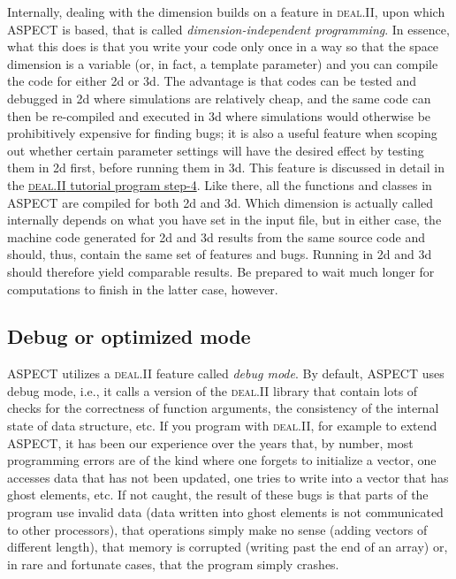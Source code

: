 \documentclass{article}
\newcommand{\dealii}{{\textsc{deal.II}}}
\newcommand{\aspect}{\textsc{ASPECT}}
\begin{document}
Internally, dealing with the dimension builds on a feature in
\dealii{}, upon which \aspect{} is based, that is called
\textit{dimension-independent programming}. In essence, what this does is that
you write your code only once in a way so that the space dimension is a
variable (or, in fact, a template parameter) and you can compile the code for
either 2d or 3d. The advantage is that codes can be tested and debugged in 2d
where simulations are relatively cheap, and the same code can then be
re-compiled and executed in 3d where simulations would otherwise be
prohibitively expensive for finding bugs; it is also a useful feature when
scoping out whether certain parameter settings will have the desired effect by
testing them in 2d first, before running them in 3d. This feature is discussed
in detail in the
\href{https://www.dealii.org/developer/doxygen/deal.II/step_4.html}{\dealii{}
  tutorial program step-4}.
Like there, all the functions and classes in
\aspect{} are compiled for both 2d and 3d. Which dimension is actually
called internally depends on what you have set in the input file, but
in either case, the machine code generated for 2d and 3d results from
the same source code and should, thus, contain the same set of
features and bugs. Running in 2d and 3d should therefore yield
comparable results. Be prepared to wait much longer for
computations to finish in the latter case, however.


\subsection{Debug or optimized mode}
\label{sec:debug-mode}

\aspect{} utilizes a \dealii{} feature called \textit{debug
  mode}. By default, \aspect{} uses debug mode, i.e., it calls a version of
the \dealii{} library that contain lots of checks for the correctness of
function arguments, the consistency of the internal state of data structure,
etc. If you program with \dealii{}, for example to extend \aspect{}, it has
been our experience over the years that, by number, most programming errors are of the
kind where one forgets to initialize a vector, one accesses data that has not
been updated, one tries to write into a vector that has ghost elements,
etc. If not caught, the result of these bugs is that parts of the program use
invalid data (data written into ghost elements is not communicated to other
processors), that operations simply make no sense (adding vectors of different
length), that memory is corrupted (writing past the end of an array) or, in
rare and fortunate cases, that the program simply crashes.
\end{document}
